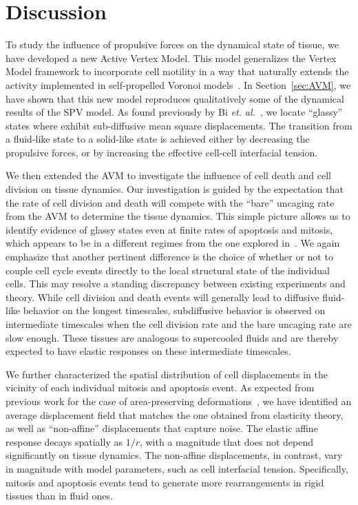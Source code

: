 \documentclass[
reprint
,aps
,amssymb
,amsmath
,superscriptaddress
]{revtex4-1}
\newcommand{\dms}[1]{{\color{magenta}#1}}
\begin{document}

\section{Discussion} \label{sec:discussion}
To study the influence of propulsive forces on the dynamical state of tissue, we have developed a new Active Vertex Model. This model generalizes the Vertex Model framework to incorporate cell motility in a way that naturally extends the activity implemented in self-propelled Voronoi models~\cite{Bi2016}. In Section~\ref{sec:AVM}, we have shown that this new model reproduces qualitatively some of the dynamical results of the SPV model. As found previously by Bi \textit{et. al.}~\cite{Bi2016}, we locate ``glassy'' states where exhibit sub-diffusive mean square displacements. The transition from a fluid-like state to a solid-like state is achieved either by decreasing the propulsive forces, or by increasing the effective cell-cell interfacial tension.


We then extended the AVM to investigate the influence of cell death and cell division on tissue dynamics. Our investigation is guided by the expectation that the rate of cell division and death will compete with the ``bare'' uncaging rate from the AVM to determine the tissue dynamics. This simple picture allows us to identify evidence of glassy states even at finite rates of apoptosis and mitosis, which appears to be in a different regimes from the one explored in~\cite{Matoz-Fernandez2017-1}. \dms{We again emphasize that another pertinent difference is the choice of whether or not to couple cell cycle events directly to the local structural state of the individual cells.} This may resolve a standing discrepancy between existing experiments and theory. While cell division and death events will generally lead to diffusive fluid-like behavior on the longest timescales, subdiffusive behavior is observed on intermediate timescales when the cell division rate and the bare uncaging rate are slow enough. These tissues are analogous to supercooled fluids and are thereby expected to have elastic responses on these intermediate timescales.

We further characterized the spatial distribution of cell displacements in the vicinity of each individual mitosis and apoptosis event. As expected from previous work for the case of area-preserving deformations~\cite{Puosi2014}, we have identified an average displacement field that matches the one obtained from elasticity theory, as well as ``non-affine'' displacements that capture noise. The elastic affine response decays spatially as $1/r$, with a magnitude that does not depend significantly on tissue dynamics. The non-affine displacements, in contrast,  vary in magnitude with model parameters, such as cell interfacial tension. Specifically, mitosis and apoptosis events tend to generate more rearrangements in rigid tissues than in fluid ones. 
\end{document}

